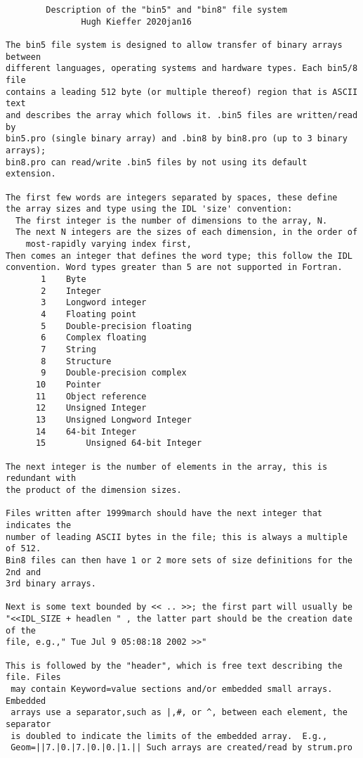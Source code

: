 \begin{verbatim}
        Description of the "bin5" and "bin8" file system  
               Hugh Kieffer 2020jan16

The bin5 file system is designed to allow transfer of binary arrays between
different languages, operating systems and hardware types. Each bin5/8 file
contains a leading 512 byte (or multiple thereof) region that is ASCII text
and describes the array which follows it. .bin5 files are written/read by 
bin5.pro (single binary array) and .bin8 by bin8.pro (up to 3 binary arrays); 
bin8.pro can read/write .bin5 files by not using its default extension.

The first few words are integers separated by spaces, these define 
the array sizes and type using the IDL 'size' convention:
  The first integer is the number of dimensions to the array, N.
  The next N integers are the sizes of each dimension, in the order of 
    most-rapidly varying index first, 
Then comes an integer that defines the word type; this follow the IDL
convention. Word types greater than 5 are not supported in Fortran.
       1	Byte	
       2	Integer	
       3	Longword integer	
       4	Floating point	
       5	Double-precision floating	
       6	Complex floating	
       7	String	
       8	Structure	
       9	Double-precision complex	
      10	Pointer	
      11	Object reference	
      12	Unsigned Integer	
      13	Unsigned Longword Integer	
      14	64-bit Integer	
      15        Unsigned 64-bit Integer

The next integer is the number of elements in the array, this is redundant with
the product of the dimension sizes.

Files written after 1999march should have the next integer that indicates the
number of leading ASCII bytes in the file; this is always a multiple of 512.
Bin8 files can then have 1 or 2 more sets of size definitions for the 2nd and 
3rd binary arrays.

Next is some text bounded by << .. >>; the first part will usually be
"<<IDL_SIZE + headlen " , the latter part should be the creation date of the
file, e.g.," Tue Jul 9 05:08:18 2002 >>"

This is followed by the "header", which is free text describing the file. Files
 may contain Keyword=value sections and/or embedded small arrays. Embedded
 arrays use a separator,such as |,#, or ^, between each element, the separator
 is doubled to indicate the limits of the embedded array.  E.g.,
 Geom=||7.|0.|7.|0.|0.|1.|| Such arrays are created/read by strum.pro


\end{verbatim}
